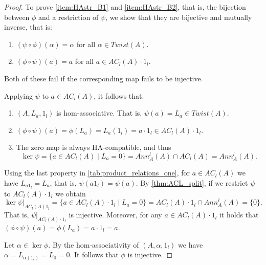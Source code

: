 \documentclass[12pt]{article}
\begin{document}
		
		\begin{proof}
			To prove \ref{item:HAstr_B1} and \ref{item:HAstr_B2}, that is, the bijection between $\phi$ and a restriction of $\psi$, we show that they are bijective and mutually inverse, that is:
			\begin{enumerate}
				\item $(\psi\circ\phi)(\alpha)=\alpha$ for all $\alpha\in Twist(A)$.
				\item $(\phi\circ\psi)(a)=a$ for all $a\in AC_l(A)\cdot 1_l$.
			\end{enumerate}
			Both of these fail if the corresponding map fails to be injective.
			
			Applying $\psi$ to $a\in AC_l(A)$, it follows that:
			\begin{enumerate}
				\item $(A,L_a,1_l)$ is hom-associative. That is, $\psi(a)=L_a\in Twist(A)$.
				\item $(\phi\circ\psi)(a)=\phi(L_a)=L_a(1_l)=a\cdot 1_l\in AC_l(A)\cdot 1_l$.
				\item The zero map is always HA-compatible, and thus
				\begin{equation*}
					\ker\psi=\{a\in AC_l(A)\mid L_a=0\}=Ann_ A ^l(A)\cap AC_l(A)=Ann_ A ^l(A).
				\end{equation*}
				
			\end{enumerate}
			Using the last property in \cref{tab:product_relations_one}, for $a\in AC_l(A)$ we have $L_{a1_l}=L_a$, that is, $\psi(a1_l)=\psi(a)$. By \cref{thm:ACL_split}, if we restrict $\psi$ to $AC_l(A)\cdot 1_l$ we obtain
			\begin{equation*}
				\ker\psi\vert_{AC_l(A)1_l}=\{a\in AC_l(A)\cdot 1_l\mid L_a{=}0\}=AC_l(A)\cdot 1_l\cap Ann_ A ^l(A)=\{0\}.
			\end{equation*}
			That is, $\psi\vert_{AC_l(A)\cdot 1_l}$ is injective. Moreover, for any $a\in AC_l(A)\cdot 1_l$ it holds that $(\phi\circ\psi)(a)=\phi(L_a)=a\cdot 1_l=a$.
			
			
			
			Let $\alpha\in\ker\phi$. By the hom-associativity of $(A,\alpha,1_l)$ we have $\alpha=L_{\alpha(1_l)}=L_0=0$. It follows that $\phi$ is injective.
			

\end{proof}
\end{document}

